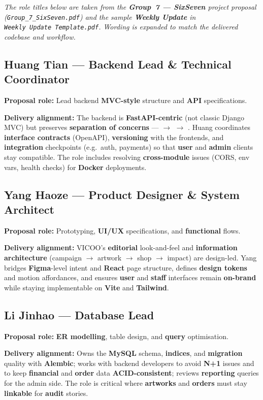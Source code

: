 \documentclass[11pt,a4paper]{article}
\begin{document}
\smallskip
\noindent\emph{The role titles below are taken from the \textbf{Group~7 --- SixSeven} project proposal (\texttt{Group\_7\_SixSeven.pdf}) and the sample \textbf{Weekly Update} in \texttt{Weekly\ Update\ Template.pdf}. Wording is expanded to match the \emph{delivered} codebase and workflow.}

\subsection{Huang Tian --- Backend Lead \& Technical Coordinator}
\textbf{Proposal role:} Lead backend \textbf{MVC-style} structure and \textbf{API} specifications.

\textbf{Delivery alignment:} The backend is \textbf{FastAPI-centric} (not classic Django MVC) but preserves \textbf{separation of concerns} ---  $\rightarrow$  $\rightarrow$ . Huang coordinates \textbf{interface contracts} (OpenAPI), \textbf{versioning} with the frontends, and \textbf{integration} checkpoints (e.g.\ auth, payments) so that \textbf{user} and \textbf{admin} clients stay compatible. The role includes resolving \textbf{cross-module} issues (CORS, env vars, health checks) for \textbf{Docker} deployments.

\subsection{Yang Haoze --- Product Designer \& System Architect}
\textbf{Proposal role:} Prototyping, \textbf{UI/UX} specifications, and \textbf{functional} flows.

\textbf{Delivery alignment:} VICOO's \textbf{editorial} look-and-feel and \textbf{information architecture} (campaign $\rightarrow$ artwork $\rightarrow$ shop $\rightarrow$ impact) are design-led. Yang bridges \textbf{Figma}-level intent and \textbf{React} page structure, defines \textbf{design tokens} and motion affordances, and ensures \textbf{user} and \textbf{staff} interfaces remain \textbf{on-brand} while staying implementable on \textbf{Vite} and \textbf{Tailwind}.

\subsection{Li Jinhao --- Database Lead}
\textbf{Proposal role:} \textbf{ER modelling}, table design, and \textbf{query} optimisation.

\textbf{Delivery alignment:} Owns the \textbf{MySQL} schema, \textbf{indices}, and \textbf{migration} quality with \textbf{Alembic}; works with backend developers to avoid \textbf{N+1} issues and to keep \textbf{financial} and \textbf{order} data \textbf{ACID-consistent}; reviews \textbf{reporting} queries for the admin side. The role is critical where \textbf{artworks} and \textbf{orders} must stay \textbf{linkable} for \textbf{audit} stories.
\end{document}
